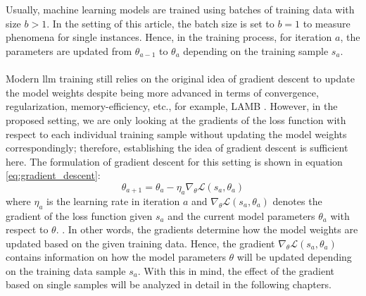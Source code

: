 \\\\
Usually, machine learning models are trained using batches of training data with size $b > 1$. In the setting of this article, the batch size is set to $b = 1$ to measure phenomena for single instances. Hence, in the training process, for iteration $a$, the parameters are updated from $\theta_{a-1}$ to $\theta_{a}$ depending on the training sample $s_a$. 
\\\\
Modern \acrshort{llm} training still relies on the original idea of gradient descent to update the model weights despite being more advanced in terms of convergence, regularization, memory-efficiency, etc., for example, LAMB \cite{you2020largebatchoptimizationdeep}. However, in the proposed setting, we are only looking at the gradients of the loss function with respect to each individual training sample without updating the model weights correspondingly; therefore, establishing the idea of gradient descent is sufficient here. The formulation of gradient descent for this setting is shown in equation \ref{eq:gradient_descent}:
\begin{equation}
    \theta_{a+1} = \theta_a - \eta_a \nabla_{\theta} \mathcal{L}(s_a, \theta_a)
    \label{eq:gradient_descent}
\end{equation}
where $\eta_a$ is the learning rate in iteration $a$ and $\nabla_{\theta} \mathcal{L}(s_a, \theta_a)$ denotes the gradient of the loss function given $s_a$ and the current model parameters $\theta_a$ with respect to $\theta$. \cite{lin2024tokenwiseinfluentialtrainingdata}. In other words, the gradients determine how the model weights are updated based on the given training data. Hence, the gradient $\nabla_{\theta} \mathcal{L}(s_a, \theta_a)$ contains information on how the model parameters $\theta$ will be updated depending on the training data sample $s_a$. With this in mind, the effect of the gradient based on single samples will be analyzed in detail in the following chapters.

